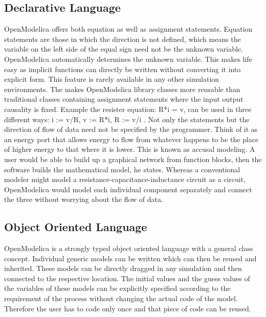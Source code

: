 \documentclass[12pt]{report}
\begin{document}
\subsection{Declarative Language}
OpenModelica offers both equation as well as assignment statements. Equation statements are those in which the direction is not defined, which means the variable on the left side of the equal sign need not be the unknown variable. OpenModelica automatically determines the unknown variable. This makes life easy as implicit functions can directly be written without converting it into explicit form. This feature is rarely available in any other simulation environments. The makes OpenModelica library classes more reusable than traditional classes containing assignment statements where the input output causality is fixed. Example the resister equation: R*i = v, can be used in three different ways: i := v/R, v := R*i, R := v/i \cite{PeterFrit}.
Not only the statements but the direction of flow of data need not be specified by the programmer. Think of it as an energy port that allows energy to flow from whatever happens to be the place of higher energy to that where it is lower. This is known as accusal modeling. A user would be able to build up a graphical network from function blocks, then the software builds the mathematical model, he states.
Whereas a conventional modeler might model a resistance-capacitance-inductance circuit as a circuit, OpenModelica would model each individual component separately and connect the three without worrying about the flow of data\cite{PeterFrit}.

\subsection{Object Oriented Language}
OpenModelica is a strongly typed object oriented language with a general class concept. Individual generic models can be written which can then be reused and inherited. These models can be directly dragged in any simulation and then connected to the respective location.
The initial values and the guess values of the variables of these models can be explicitly specified according to the requirement of the process without changing the actual code of the model. Therefore the user has to code only once and that piece of code can be reused.
\end{document}
